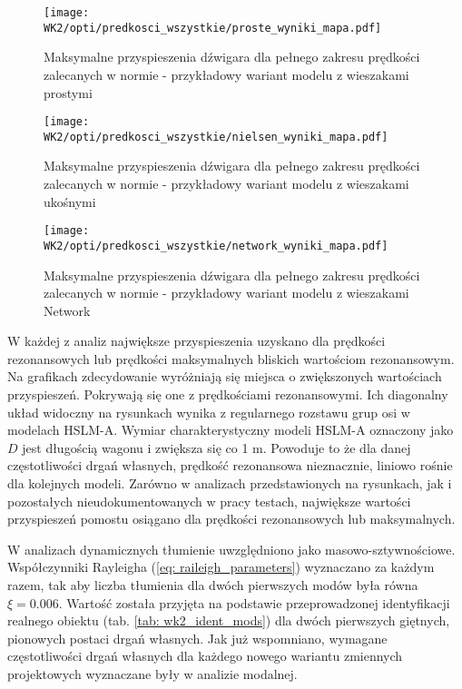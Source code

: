 \begin{figure}[hbt!]
	\centering
	\texttt{[image: WK2/opti/predkosci\_wszystkie/proste\_wyniki\_mapa.pdf]}
	\captionsetup{justification=centering}
\caption{Maksymalne przyspieszenia dźwigara dla pełnego zakresu prędkości zalecanych w normie - przykładowy wariant modelu z wieszakami prostymi}
\label{fig:wk2_opti_proste_predkosci_test_all_proste}
\end{figure}
	
	
\begin{figure}[hbt!]
	\centering
	\texttt{[image: WK2/opti/predkosci\_wszystkie/nielsen\_wyniki\_mapa.pdf]}
	\captionsetup{justification=centering}
\caption{Maksymalne przyspieszenia dźwigara dla pełnego zakresu prędkości zalecanych w normie - przykładowy wariant modelu z wieszakami ukośnymi}
\label{fig:wk2_opti_proste_predkosci_test_all_nielsen}
\end{figure}
	
\begin{figure}[hbt!]
	\centering
	\texttt{[image: WK2/opti/predkosci\_wszystkie/network\_wyniki\_mapa.pdf]}	
	\captionsetup{justification=centering}
	\caption{Maksymalne przyspieszenia dźwigara dla pełnego zakresu prędkości zalecanych w normie - przykładowy wariant modelu z wieszakami Network}
	\label{fig:wk2_opti_proste_predkosci_test_all_network}
\end{figure}

W każdej z analiz największe przyspieszenia uzyskano dla prędkości rezonansowych lub prędkości maksymalnych bliskich wartościom rezonansowym. Na grafikach zdecydowanie wyróżniają się miejsca o zwiększonych wartościach przyspieszeń. Pokrywają się one z prędkościami rezonansowymi. Ich diagonalny układ widoczny na rysunkach wynika z regularnego rozstawu grup osi w modelach HSLM-A. Wymiar charakterystyczny modeli HSLM-A oznaczony jako $D$ jest długością wagonu i zwiększa się co 1 m. Powoduje to że dla danej częstotliwości drgań własnych, prędkość rezonansowa nieznacznie, liniowo rośnie dla kolejnych modeli. Zarówno w analizach przedstawionych na rysunkach, jak i pozostałych nieudokumentowanych w pracy testach, największe wartości przyspieszeń pomostu osiągano dla prędkości rezonansowych lub maksymalnych.

W analizach dynamicznych tłumienie uwzględniono jako masowo-sztywnościowe. Współczynniki Rayleigha (\ref{eq: raileigh_parameters}) wyznaczano za każdym razem, tak aby liczba tłumienia dla dwóch pierwszych modów była równa $\xi=0.006$. Wartość została przyjęta na podstawie przeprowadzonej identyfikacji realnego obiektu (tab. \ref{tab: wk2_ident_mods}) dla dwóch pierwszych giętnych, pionowych postaci drgań własnych. Jak już wspomniano, wymagane częstotliwości drgań własnych dla każdego nowego wariantu zmiennych projektowych wyznaczane były w analizie modalnej.


